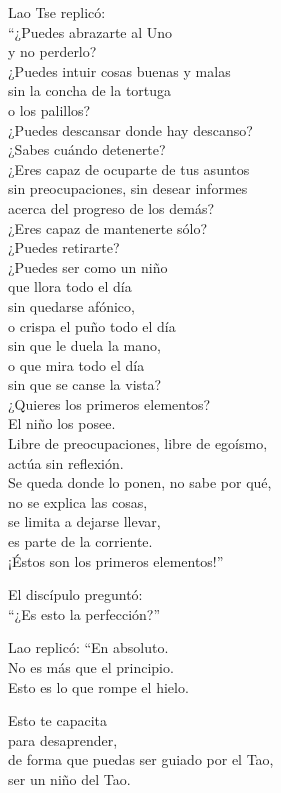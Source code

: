 \documentclass[book,b5paper,hidelinks,final]{memoir}
\begin{document}
	Lao Tse replicó:\\
	``¿Puedes abrazarte al Uno\\
	y no perderlo?\\
	¿Puedes intuir cosas buenas y malas\\
	sin la concha de la tortuga\\
	o los palillos?\\
	¿Puedes descansar donde hay descanso?\\
	¿Sabes cuándo detenerte?\\
	¿Eres capaz de ocuparte de tus asuntos\\
	sin preocupaciones, sin desear informes\\
	acerca del progreso de los demás?\\
	¿Eres capaz de mantenerte sólo?\\
	¿Puedes retirarte?\\
	¿Puedes ser como un niño\\
	que llora todo el día\\
	sin quedarse afónico,\\
	o crispa el puño todo el día\\
	sin que le duela la mano,\\
	o que mira todo el día\\
	sin que se canse la vista?\\
	¿Quieres los primeros elementos?\\
	El niño los posee.\\
	Libre de preocupaciones, libre de egoísmo,\\
	actúa sin reflexión.\\
	Se queda donde lo ponen, no sabe por qué,\\
	no se explica las cosas,\\
	se limita a dejarse llevar,\\
	es parte de la corriente.\\
	¡Éstos son los primeros elementos!''
	
	El discípulo preguntó:\\
	``¿Es esto la perfección?''
	
	Lao replicó: ``En absoluto.\\
	No es más que el principio.\\
	Esto es lo que rompe el hielo.
	
	Esto te capacita\\
	para desaprender,\\
	de forma que puedas ser guiado por el Tao,\\
	ser un niño del Tao.
	
\end{document}
